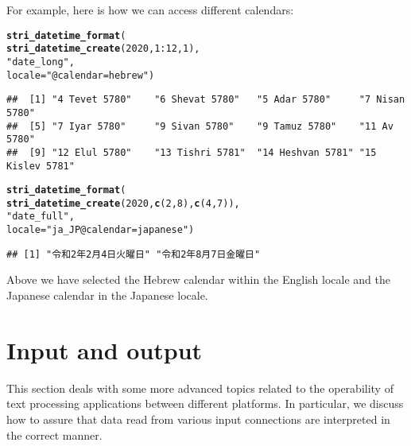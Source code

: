\documentclass[nojss]{jss}\usepackage[]{graphicx}\usepackage[]{xcolor}
\makeatletter
\newcommand{\hlnum}[1]{\textcolor[rgb]{0.686,0.059,0.569}{#1}}%
\newcommand{\hlstr}[1]{\textcolor[rgb]{0.192,0.494,0.8}{#1}}%
\newcommand{\hlopt}[1]{\textcolor[rgb]{0,0,0}{#1}}%
\newcommand{\hlstd}[1]{\textcolor[rgb]{0.345,0.345,0.345}{#1}}%
\newcommand{\hlkwc}[1]{\textcolor[rgb]{0.333,0.667,0.333}{#1}}%
\newcommand{\hlkwd}[1]{\textcolor[rgb]{0.737,0.353,0.396}{\textbf{#1}}}%
\newenvironment{kframe}{%
 \def\at@end@of@kframe{}%
 \ifinner\ifhmode%
  \def\at@end@of@kframe{\end{minipage}}%
  \begin{minipage}{\columnwidth}%
 \fi\fi%
 \def\FrameCommand##1{\hskip\@totalleftmargin \hskip-\fboxsep
 \colorbox{shadecolor}{##1}\hskip-\fboxsep
     \hskip-\linewidth \hskip-\@totalleftmargin \hskip\columnwidth}%
 \MakeFramed {\advance\hsize-\width
   \@totalleftmargin\z@ \linewidth\hsize
   \@setminipage}}%
 {\par\unskip\endMakeFramed%
 \at@end@of@kframe}
\newenvironment{knitrout}{}{} %
\makeatother
\begin{document}
For example, here is how we can access different calendars:

\begin{knitrout}
\color{fgcolor}\begin{kframe}
\begin{alltt}
\hlkwd{stri_datetime_format}\hlstd{(}
  \hlkwd{stri_datetime_create}\hlstd{(}\hlnum{2020}\hlstd{,} \hlnum{1}\hlopt{:}\hlnum{12}\hlstd{,} \hlnum{1}\hlstd{),}
  \hlstr{"date_long"}\hlstd{,}
  \hlkwc{locale}\hlstd{=}\hlstr{"@calendar=hebrew"}\hlstd{)}
\end{alltt}
\begin{verbatim}
##  [1] "4 Tevet 5780"    "6 Shevat 5780"   "5 Adar 5780"     "7 Nisan 5780"   
##  [5] "7 Iyar 5780"     "9 Sivan 5780"    "9 Tamuz 5780"    "11 Av 5780"     
##  [9] "12 Elul 5780"    "13 Tishri 5781"  "14 Heshvan 5781" "15 Kislev 5781"
\end{verbatim}
\begin{alltt}
\hlkwd{stri_datetime_format}\hlstd{(}
  \hlkwd{stri_datetime_create}\hlstd{(}\hlnum{2020}\hlstd{,} \hlkwd{c}\hlstd{(}\hlnum{2}\hlstd{,} \hlnum{8}\hlstd{),} \hlkwd{c}\hlstd{(}\hlnum{4}\hlstd{,} \hlnum{7}\hlstd{)),}
  \hlstr{"date_full"}\hlstd{,}
  \hlkwc{locale}\hlstd{=}\hlstr{"ja_JP@calendar=japanese"}\hlstd{)}
\end{alltt}
\begin{verbatim}
## [1] "令和2年2月4日火曜日" "令和2年8月7日金曜日"
\end{verbatim}
\end{kframe}
\end{knitrout}

\noindent
Above we have selected the Hebrew calendar within the
English locale and the Japanese calendar in the Japanese locale.












\section{Input and output}\label{Sec:io}

This section deals with some more advanced topics related to the
operability of text processing applications
between different platforms. In particular, we discuss
how to assure that data read from various input connections
are interpreted in the correct manner.
\end{document}
